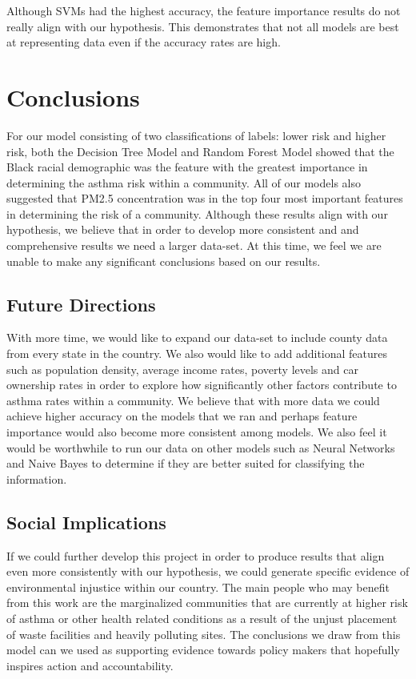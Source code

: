\documentclass{article}
\begin{document}
Although SVMs had the highest accuracy, the feature importance results do not really align with our hypothesis. This demonstrates that not all models are best at representing data even if the accuracy rates are high. 

\section{Conclusions}
\label{conclusion}

For our model consisting of two classifications of labels: lower risk and higher risk, both the Decision Tree Model and Random Forest Model showed that the Black racial demographic was the feature with the greatest importance in determining the asthma risk within a community. All of our models also suggested that PM2.5 concentration was in the top four most important features in determining the risk of a community. Although these results align with our hypothesis, we believe that in order to develop more consistent and and comprehensive results we need a larger data-set. At this time, we feel we are unable to make any significant conclusions based on our results.   

\subsection{Future Directions}
\label{Future Directions}

With more time, we would like to expand our data-set to include county data from every state in the country. We also would like to add additional features such as population density, average income rates, poverty levels and car ownership rates in order to explore how significantly other factors contribute to asthma rates within a community. We believe that with more data we could achieve higher accuracy on the models that we ran and perhaps feature importance would also become more consistent among models. We also feel it would be worthwhile to run our data on other models such as Neural Networks and Naive Bayes to determine if they are better suited for classifying the information. 

\subsection{Social Implications}
\label{social implications}

If we could further develop this project in order to produce results that align even more consistently with our hypothesis, we could generate specific evidence of environmental injustice within our country. The main people who may benefit from this work are the marginalized communities that are currently at higher risk of asthma or other health related conditions as a result of the unjust placement of waste facilities and heavily polluting sites. The conclusions we draw from this model can we used as supporting evidence towards policy makers that hopefully inspires action and accountability. 
\end{document}
